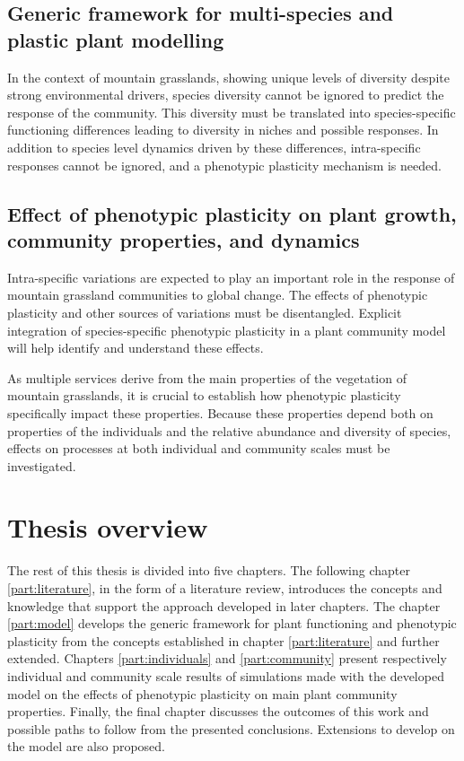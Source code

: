 \subsection{Generic framework for multi-species and plastic plant modelling} %

In the context of mountain grasslands, showing unique levels of diversity despite strong environmental drivers, species diversity cannot be ignored to predict the response of the community. This diversity must be translated into species-specific functioning differences leading to diversity in niches and possible responses. In addition to species level dynamics driven by these differences, intra-specific responses cannot be ignored, and a phenotypic plasticity mechanism is needed.




\subsection{Effect of phenotypic plasticity on plant growth, community properties, and dynamics}

Intra-specific variations are expected to play an important role in the response of mountain grassland communities to global change. The effects of phenotypic plasticity and other sources of variations must be disentangled. Explicit integration of species-specific phenotypic plasticity in a plant community model will help identify and understand these effects.

As multiple services derive from the main properties of the vegetation of mountain grasslands, it is crucial to establish how phenotypic plasticity specifically impact these properties. Because these properties depend both on properties of the individuals and the relative abundance and diversity of species, effects on processes at both individual and community scales must be investigated.


\section{Thesis overview}

The rest of this thesis is divided into five chapters. The following chapter \ref{part:literature}, in the form of a literature review, introduces the concepts and knowledge that support the approach developed in later chapters. The chapter \ref{part:model} develops the generic framework for plant functioning and phenotypic plasticity from the concepts established in chapter \ref{part:literature} and further extended. Chapters \ref{part:individuals} and \ref{part:community} present respectively individual and community scale results of simulations made with the developed model \model on the effects of phenotypic plasticity on main plant community properties. Finally, the final chapter discusses the outcomes of this work and possible paths to follow from the presented conclusions. Extensions to develop on the model are also proposed.


